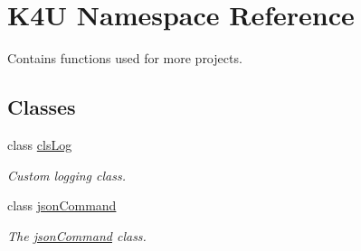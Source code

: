 \hypertarget{namespace_k4_u}{\section{K4\-U Namespace Reference}
\label{d6/d75/namespace_k4_u}
}


Contains functions used for more projects.  


\subsection*{Classes}
\begin{DoxyCompactItemize}
\item 
class \hyperlink{class_k4_u_1_1cls_log}{cls\-Log}
\begin{DoxyCompactList}\small\item\em Custom logging class. \end{DoxyCompactList}\item 
class \hyperlink{class_k4_u_1_1json_command}{json\-Command}
\begin{DoxyCompactList}\small\item\em The \hyperlink{class_k4_u_1_1json_command}{json\-Command} class. \end{DoxyCompactList}\end{DoxyCompactItemize}
